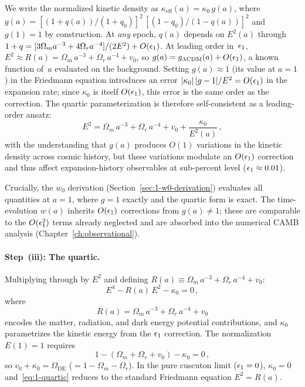 We write the normalized kinetic density as $\kappa_{\mathrm{eff}}(a) = \kappa_0\, g(a)$, where $g(a) = [(1+q(a))/(1+q_0)]^2\,[(1-q_0)/(1-q(a))]^2$ and $g(1) = 1$ by construction. At \emph{any} epoch, $q(a)$ depends on $E^2(a)$ through $1+q = [3\Omega_m a^{-3} + 4\Omega_r a^{-4}]/(2E^2) + O(\epsilon_1)$. At leading order in~$\epsilon_1$, $E^2 \approx R(a) = \Omega_m\,a^{-3} + \Omega_r\,a^{-4} + v_0$, so $g(a) = g_{\Lambda\mathrm{CDM}}(a) + O(\epsilon_1)$, a known function of~$a$ evaluated on the \LCDM{} background. Setting $g(a) \approx 1$ (its value at $a = 1$) in the Friedmann equation introduces an error $|\kappa_0|\,|g-1|/E^2 = O(\epsilon_1)$ in the expansion rate; since $\kappa_0$ is itself $O(\epsilon_1)$, this error is the same order as the correction. The quartic parameterization is therefore self-consistent as a leading-order ansatz:
\begin{equation}
E^2 = \Omega_m\, a^{-3} + \Omega_r\, a^{-4} + v_0 + \frac{\kappa_0}{E^2(a)}\,,
\end{equation}
with the understanding that $g(a)$ produces $O(1)$ variations in the kinetic density across cosmic history, but these variations modulate an $O(\epsilon_1)$ correction and thus affect expansion-history observables at sub-percent level ($\epsilon_1 \approx 0.01$).

Crucially, the $w_0$ derivation (Section~\ref{sec:1-w0-derivation}) evaluates all quantities at $a = 1$, where $g = 1$ exactly and the quartic form is exact. The time-evolution $w(a)$ inherits $O(\epsilon_1)$ corrections from $g(a) \neq 1$; these are comparable to the $O(\epsilon_1^2)$ terms already neglected and are absorbed into the numerical CAMB analysis (Chapter~\ref{ch:observational}).

\paragraph{Step~(iii): The quartic.} Multiplying through by $E^2$ and defining $R(a) \equiv \Omega_m\, a^{-3} + \Omega_r\, a^{-4} + v_0$:
\begin{equation}
\label{eq:1-quartic}
\boxed{E^4 - R(a)\, E^2 - \kappa_0 = 0}\,,
\end{equation}
where
\begin{equation}
\label{eq:1-R-function}
R(a) = \Omega_m\, a^{-3} + \Omega_r\, a^{-4} + v_0
\end{equation}
encodes the matter, radiation, and dark energy potential contributions, and $\kappa_0$ parametrizes the kinetic energy from the $\epsilon_1$ correction. The normalization $E(1) = 1$ requires
\begin{equation}
\label{eq:1-normalization}
1 - (\Omega_m + \Omega_r + v_0) - \kappa_0 = 0\,,
\end{equation}
so $v_0 + \kappa_0 = \Omega_{\mathrm{DE}}$ ($= 1 - \Omega_m - \Omega_r$). In the pure cuscuton limit ($\epsilon_1 = 0$), $\kappa_0 = 0$ and~\eqref{eq:1-quartic} reduces to the standard Friedmann equation $E^2 = R(a)$.


